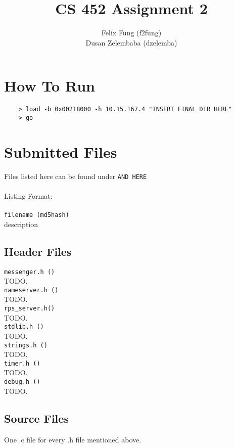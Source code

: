 \documentclass[letterpaper]{article}
\begin{document}
\title{CS 452 Assignment 2}
\author{Felix Fung (f2fung) \\ Dusan Zelembaba (dzelemba)}
\maketitle

\section{How To Run}
\begin{verbatim}
	> load -b 0x00218000 -h 10.15.167.4 "INSERT FINAL DIR HERE"
	> go
\end{verbatim}

\section{Submitted Files}
Files listed here can be found under \verb!AND HERE!\\
\\
Listing Format:\\
\\
\verb!filename (md5hash)!\\
description

\subsection{Header Files}
\verb!messenger.h ()!\\
TODO.\\
\verb!nameserver.h ()!\\
TODO.\\
\verb!rps_server.h()!\\
TODO.\\
\verb!stdlib.h ()!\\
TODO.\\
\verb!strings.h ()!\\
TODO.\\
\verb!timer.h ()!\\
TODO.\\
\verb!debug.h ()!\\
TODO.\\

\subsection{Source Files}

One .c file for every .h file mentioned above.\\
\end{document}
